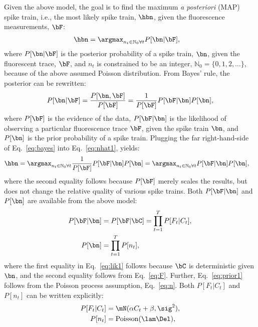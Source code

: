 Given the above model, the goal is to find the maximum \emph{a posteriori} (MAP) spike train, i.e.,  the most likely spike train, $\hbn$,  given the fluorescence measurements, $\bF$:
\begin{align} \label{eq:nhat1} 
\hbn &=  \anx P[\bn | \bF], 
\end{align}
\noindent where $P[\bn | \bF]$ is the posterior probability of a spike train, $\bn$, given the fluorescent trace, $\bF$, and $n_t$ is constrained to be an integer, $\mathbb{N}_0=\{0,1,2,\ldots\}$, because of the above assumed Poisson distribution.  From Bayes' rule, the posterior can be rewritten:
\begin{align} \label{eq:bayes}
P[\bn | \bF] = \frac{P[\bn, \bF]}{P[\bF]} = \frac{1}{P[\bF]} P[\bF | \bn] P[\bn],
\end{align}
\noindent where $P[\bF]$ is the evidence of the data, $P[\bF | \bn]$ is the likelihood of observing a particular fluorescence trace $\bF$, given the spike train $\bn$, and $P[\bn]$ is the prior probability of a spike train.  Plugging the far right-hand-side of Eq.~\eqref{eq:bayes} into Eq.~\eqref{eq:nhat1}, yields:
\begin{align} \label{eq:nhat2} 
\hbn &=  \anx \frac{1}{P[\bF]} P[\bF | \bn] P[\bn] =  \anx  P[\bF | \bn] P[\bn],
\end{align}
\noindent where the second equality follows because $P[\bF]$ merely scales the results, but does not change the relative quality of various spike trains.  Both $P[\bF | \bn]$ and $P[\bn]$ are available from the above model:
\begin{subequations} \label{eq:post1}
\begin{align}
P[\bF | \bn]&= P[\bF | \bC] 	= \prod_{t=1}^T P[F_t | C_t], \label{eq:lik1} \\ 
P[\bn] 		&= \prod_{t=1}^T P[n_t], \label{eq:prior1}
\end{align}
\end{subequations}
\noindent where the first equality in Eq.~\eqref{eq:lik1} follows because $\bC$ is deterministic given $\bn$, and the second equality follows from Eq.~\eqref{eq:F}. Further, Eq.~\eqref{eq:prior1} follows from the Poisson process assumption, Eq.~\eqref{eq:n}.  Both $P[F_t | C_t]$ and $P[n_t]$ can be written explicitly:
\begin{subequations} \label{eq:post2}
\begin{align}
P[F_t | C_t] &= \mN(\alpha C_t+\beta,\sig^2), \label{eq:lik2} \\
P[n_t] &= \text{Poisson}(\lam \Del), \label{eq:prior2} 
\end{align}
\end{subequations}
